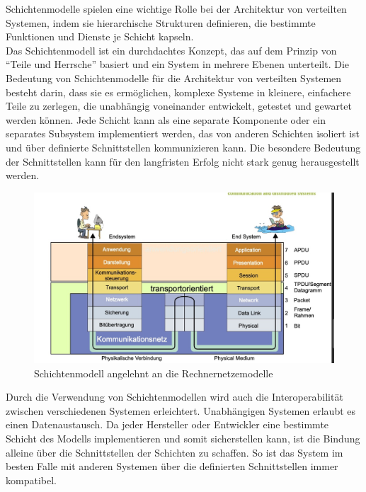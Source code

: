 \documentclass[../vs-script-first-v01.tex]{subfiles}
\begin{document}
Schichtenmodelle spielen eine wichtige Rolle bei der Architektur von verteilten Systemen, indem sie hierarchische Strukturen definieren, die bestimmte Funktionen und Dienste je Schicht kapseln.
\mbox{}\\ 
Das Schichtenmodell ist ein durchdachtes Konzept, das auf dem Prinzip von \enquote{Teile und Herrsche} basiert und ein System in mehrere Ebenen unterteilt. Die Bedeutung von Schichtenmodelle für die Architektur von verteilten Systemen besteht darin, dass sie es ermöglichen, komplexe Systeme in kleinere, einfachere Teile zu zerlegen, die unabhängig voneinander entwickelt, getestet und gewartet werden können. Jede Schicht kann als eine separate Komponente oder ein separates Subsystem implementiert werden, das von anderen Schichten isoliert ist und über definierte Schnittstellen kommunizieren kann. Die besondere Bedeutung der Schnittstellen kann für den langfristen Erfolg nicht stark genug herausgestellt werden.
\begin{figure}[b!] %
    \centering
    \includegraphics[width=0.95\linewidth]{fig/graphics/Schichten.jpg}
    \caption{Schichtenmodell angelehnt an die Rechnernetzemodelle}
    \label{fig:schichtenmodell}
\end{figure}
Durch die Verwendung von Schichtenmodellen wird auch die Interoperabilität zwischen verschiedenen Systemen erleichtert. Unabhängigen Systemen erlaubt es einen Datenaustausch. Da jeder Hersteller oder Entwickler eine bestimmte Schicht des Modells implementieren und somit sicherstellen kann, ist die Bindung alleine über die Schnittstellen der Schichten zu schaffen. So ist das System im besten Falle mit anderen Systemen über die definierten Schnittstellen immer kompatibel.
\end{document}
